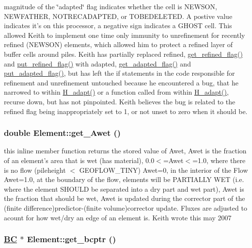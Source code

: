magnitude of the \char`\"{}adapted\char`\"{} flag indicates whether the cell is NEWSON, NEWFATHER, NOTRECADAPTED, or TOBEDELETED. A postive value indicates it's on this processor, a negative sign indicates a GHOST cell. This allowed Keith to implement one time only immunity to unrefinement for recently refined (NEWSON) elements, which allowed him to protect a refined layer of buffer cells around piles. Keith has partially replaced refined, \hyperlink{classElement_a33}{get\_\-refined\_\-flag()} and \hyperlink{classElement_a36}{put\_\-refined\_\-flag()} with adapted, \hyperlink{classElement_a34}{get\_\-adapted\_\-flag()} and \hyperlink{classElement_a37}{put\_\-adapted\_\-flag()}, but has left the if statements in the code responsible for refinement and unrefinement untouched because he encountered a bug, that he narrowed to within \hyperlink{hadpt_8C_a12}{H\_\-adapt()} or a function called from within \hyperlink{hadpt_8C_a12}{H\_\-adapt()}, recurse down, but has not pinpointed. Keith believes the bug is related to the refined flag being inappropriately set to 1, or not unset to zero when it should be. 

\hypertarget{classElement_a121}{
\subsubsection[get\_\-Awet]{\setlength{\rightskip}{0pt plus 5cm}double Element::get\_\-Awet ()}}
\label{classElement_a121}


this inline member function returns the stored value of Awet, Awet is the fraction of an element's area that is wet (has material), 0.0$<$=Awet$<$=1.0, where there is no flow (pileheight $<$ GEOFLOW\_\-TINY) Awet=0, in the interior of the Flow Awet=1.0, at the boundary of the flow, elements will be PARTIALLY WET (i.e. where the element SHOULD be separated into a dry part and wet part), Awet is the fraction that should be wet, Awet is updated during the corrector part of the (finite difference)predictor-(finite volume)corrector update. Fluxes are adjusted to acount for how wet/dry an edge of an element is. Keith wrote this may 2007 

\hypertarget{classElement_a30}{
\subsubsection[get\_\-bcptr]{\setlength{\rightskip}{0pt plus 5cm}\hyperlink{structBC}{BC} $\ast$ Element::get\_\-bcptr ()}}
\label{classElement_a30}


